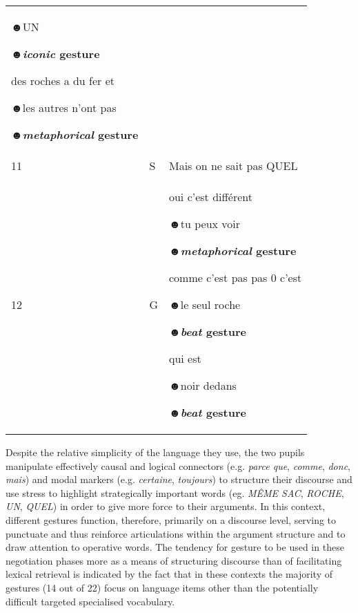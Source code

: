 \documentclass[output=paper]{langscibook}
\begin{document}
\begin{longtable}{llp{}}
☻UN

\textbf{\textit{☻iconic} \textbf{gesture}}

des roches a du fer et 

☻les autres n’ont pas

\textbf{\textit{☻metaphorical} \textbf{gesture}}\\
11 & S & Mais on ne sait pas QUEL\\
12 & G & oui c’est différent

☻tu peux voir

☻\textbf{\textit{metaphorical} \textbf{gesture}}

comme c’est pas pas 0 c’est

☻le seul roche

\textbf{\textit{☻beat} \textbf{gesture}}

qui est 

☻noir dedans

\textbf{\textit{☻beat} \textbf{gesture}}\\
\end{longtable}

Despite the relative simplicity of the language they use, the two pupils manipulate effectively causal and logical connectors (e.g. \textit{parce que}, \textit{comme}, \textit{donc}, \textit{mais}) and modal markers (e.g. \textit{certaine}, \textit{toujours}) to structure their discourse and use stress to highlight strategically  important words (eg. \textit{MÊME SAC}, \textit{ROCHE}, \textit{UN}, \textit{QUEL}) in order to give more force to their arguments. In this context, different gestures function, therefore, primarily on a discourse level, serving to punctuate and thus reinforce articulations within the argument structure and to draw attention to operative words. The tendency for gesture to be used in these negotiation phases more as a means of structuring discourse than of facilitating lexical retrieval is indicated by the fact that in these contexts the majority of gestures (14 out of 22) focus on language items other than the potentially difficult targeted specialised vocabulary.
\end{document}
